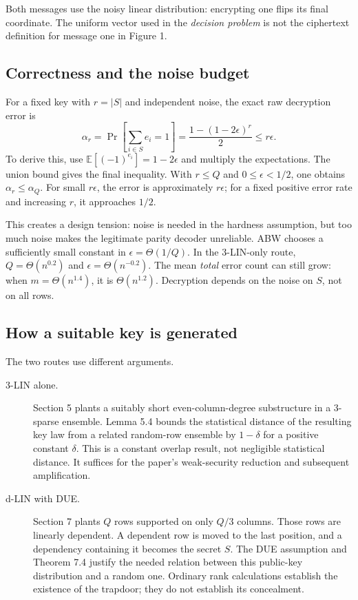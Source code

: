 \documentclass[11pt,a4paper]{article}
\newcommand{\E}{\mathbb E}
\begin{document}
Both messages use the noisy linear distribution: encrypting one flips its final coordinate. The uniform vector used in the \emph{decision problem} is not the ciphertext definition for message one in Figure 1.

\subsection{Correctness and the noise budget}
For a fixed key with $r=|S|$ and independent noise, the exact raw decryption error is
\begin{equation}
 \alpha_r=\Pr\left[\sum_{i\in S}e_i=1\right]
 =\frac{1-(1-2\epsilon)^r}{2}\leq r\epsilon.
\end{equation}
To derive this, use $\E[(-1)^{e_i}]=1-2\epsilon$ and multiply the expectations. The union bound gives the final inequality. With $r\leq Q$ and $0\leq\epsilon<1/2$, one obtains $\alpha_r\leq\alpha_Q$. For small $r\epsilon$, the error is approximately $r\epsilon$; for a fixed positive error rate and increasing $r$, it approaches $1/2$.

This creates a design tension: noise is needed in the hardness assumption, but too much noise makes the legitimate parity decoder unreliable. ABW chooses a sufficiently small constant in $\epsilon=\Theta(1/Q)$. In the 3-LIN-only route, $Q=\Theta(n^{0.2})$ and $\epsilon=\Theta(n^{-0.2})$. The mean \emph{total} error count can still grow: when $m=\Theta(n^{1.4})$, it is $\Theta(n^{1.2})$. Decryption depends on the noise on $S$, not on all rows.

\subsection{How a suitable key is generated}
The two routes use different arguments.
\begin{description}
\item[3-LIN alone.] Section 5 plants a suitably short even-column-degree substructure in a 3-sparse ensemble. Lemma 5.4 bounds the statistical distance of the resulting key law from a related random-row ensemble by $1-\delta$ for a positive constant $\delta$. This is a constant overlap result, not negligible statistical distance. It suffices for the paper's weak-security reduction and subsequent amplification.
\item[d-LIN with DUE.] Section 7 plants $Q$ rows supported on only $Q/3$ columns. Those rows are linearly dependent. A dependent row is moved to the last position, and a dependency containing it becomes the secret $S$. The DUE assumption and Theorem 7.4 justify the needed relation between this public-key distribution and a random one. Ordinary rank calculations establish the existence of the trapdoor; they do not establish its concealment.
\end{description}
\end{document}

